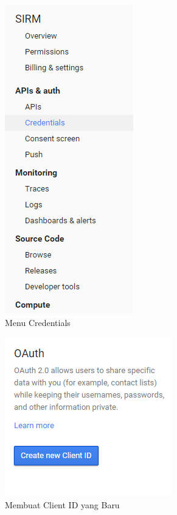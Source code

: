 \begin{figure}[H]
\centering
\includegraphics[scale=1]{Gambar/credentials.png}
\caption[Menu Credentials]{Menu Credentials} 
\label{fig:credentials}
\end{figure}

\begin{figure}[H]
\centering
\includegraphics[scale=1]{Gambar/newclientid.png}
\caption[Membuat Client ID yang Baru]{Membuat Client ID yang Baru} 
\label{fig:newclientid}
\end{figure}

